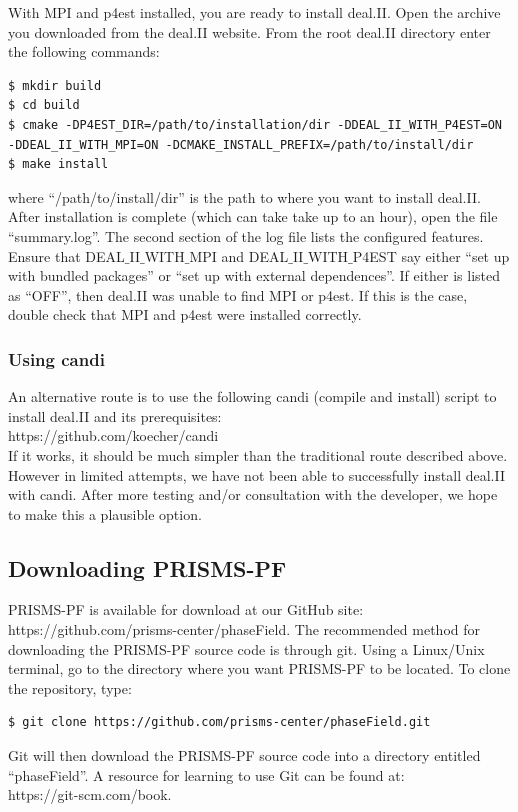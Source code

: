 \documentclass[10pt]{article} %
\begin{document}
With MPI and p4est installed, you are ready to install deal.II. Open the archive you downloaded from the deal.II website. From the root deal.II directory enter the following commands:
\begin{lstlisting}
$ mkdir build
$ cd build
$ cmake -DP4EST_DIR=/path/to/installation/dir -DDEAL_II_WITH_P4EST=ON 
-DDEAL_II_WITH_MPI=ON -DCMAKE_INSTALL_PREFIX=/path/to/install/dir
$ make install
\end{lstlisting}
where ``/path/to/install/dir'' is the path to where you want to install deal.II. After installation is complete (which can take take up to an hour), open the file ``summary.log''. The second section of the log file lists the configured features. Ensure that DEAL$\_$II$\_$WITH$\_$MPI and DEAL$\_$II$\_$WITH$\_$P4EST say either ``set up with bundled packages'' or ``set up with external dependences''. If either is listed as ``OFF'', then deal.II was unable to find MPI or p4est. If this is the case, double check that MPI and p4est were installed correctly. 

\subsubsection{Using candi}
An alternative route is to use the following candi (compile and install) script to install deal.II and its prerequisites: \\
https://github.com/koecher/candi \\

If it works, it should be much simpler than the traditional route described above. However in limited attempts, we have not been able to successfully install deal.II with candi. After more testing and/or consultation with the developer, we hope to make this a plausible option.

\subsection{Downloading PRISMS-PF}
PRISMS-PF is available for download at our GitHub site: https://github.com/prisms-center/phaseField. The recommended method for downloading the PRISMS-PF source code is through git. Using a Linux/Unix terminal, go to the directory where you want PRISMS-PF to be located. To clone the repository, type:
\begin{lstlisting}
$ git clone https://github.com/prisms-center/phaseField.git
\end{lstlisting}
Git will then download the PRISMS-PF source code into a directory entitled ``phaseField''. A resource for learning to use Git can be found at: \\https://git-scm.com/book.
\end{document}
